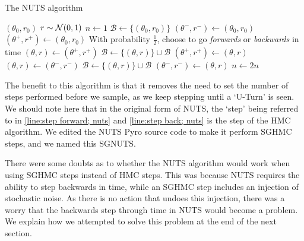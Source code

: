 \begin{algorithm}
    \caption{The NUTS algorithm}\label{alg:nuts}
    \begin{algorithmic}[5]
        \Require $(\theta_0, r_0)$
        \State $r \sim \mathcal N(0,1)$
        \State $n \gets 1$
        \State $\mathcal{B}\gets \{(\theta_0, r_0)\}$
        \State $(\theta^-, r^-) \gets (\theta_0, r_0) $
        \State $(\theta^+, r^+) \gets (\theta_0, r_0) $
            \State With probability $\frac 1 2$, choose to go \textit{forwards} or \textit{backwards} in time
                \State $(\theta, r) \gets (\theta^+, r^+)$
                    \label{line:step forward; nuts}
                   \State $\mathcal{B} \gets \{(\theta, r)\} \cup \mathcal{B}$
                \EndFor
                \State $(\theta^+, r^+) \gets (\theta, r)$
            \EndIf
                \State $(\theta, r) \gets (\theta^-, r^-)$
                    \label{line:step back; nuts}
                    \State $\mathcal{B} \gets \{(\theta, r)\} \cup \mathcal{B}$
                \EndFor
                \State $(\theta^-, r^-) \gets (\theta, r)$
            \EndIf
            \State $n \gets 2n$
        \EndWhile
        \label{line:choose subset; nuts} 
    \end{algorithmic}
\end{algorithm}

The benefit to this algorithm is that it removes the need to set the number of steps performed before we sample, as we keep stepping until a `U-Turn' is seen. We should note here that in the original form of NUTS, the `step' being referred to in \cref{line:step forward; nuts} and \cref{line:step back; nuts} is the step of the HMC algorithm. We edited the NUTS Pyro source code to make it perform SGHMC steps, and we named this SGNUTS.

There were some doubts as to whether the NUTS algorithm would work when using SGHMC steps instead of HMC steps. This was because NUTS requires the ability to step backwards in time, while an SGHMC step includes an injection of stochastic noise. As there is no action that undoes this injection, there was a worry that the backwards step through time in NUTS would become a problem. We explain how we attempted to solve this problem at the end of the next section.


